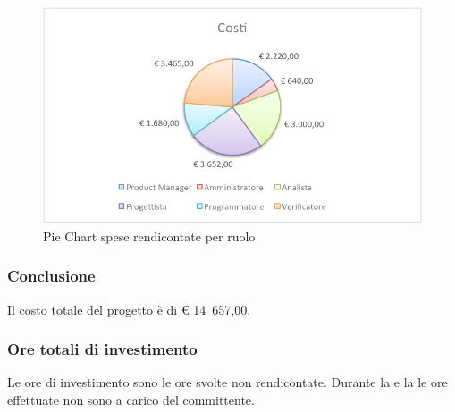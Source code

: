 				\begin{figure}[H]\centering
					\includegraphics[width=\textwidth]{PianoDiProgetto/Pics/ChartTotCostiRendic.pdf}
					\caption{Pie Chart spese rendicontate per ruolo}
				\end{figure}
		\subsubsection{Conclusione}
			Il costo totale del progetto è di \euro{} 14~657,00.
		\subsubsection{Ore totali di investimento}
			Le ore di investimento sono le ore svolte non rendicontate. Durante la  e la  le ore effettuate non sono a carico del committente.

